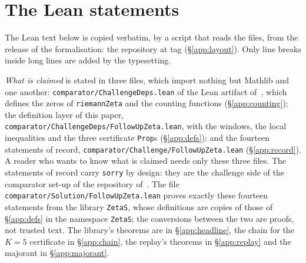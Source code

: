 \section{The Lean statements}\label{app:lean}
\sloppy

The Lean text below is copied verbatim, by a script that reads the files, from the release of the formalisation: the repository
\repourl{} at tag \repotag{} (\S\ref{app:layout}). Only line breaks inside long lines are added by the typesetting.

\emph{What is claimed} is stated in three files, which import nothing but Mathlib and one another: \texttt{comparator/ChallengeDeps.lean} of the Lean artifact
of~\cite{AF}, which defines the zeros of \texttt{riemannZeta} and the counting functions (\S\ref{app:counting}); the definition layer of this
paper, \texttt{comparator/ChallengeDeps/FollowUpZeta.lean}, with the windows, the local inequalities and the three certificate
\texttt{Prop}s (\S\ref{app:defs}); and the fourteen statements of record, \texttt{comparator/Challenge/FollowUpZeta.lean}
(\S\ref{app:record}). A reader who wants to know what is claimed needs only these three files. The statements of record carry
\texttt{sorry} by design: they are the challenge side of the comparator set-up of the repository of~\cite{AF}. The file
\texttt{comparator/Solution/FollowUpZeta.lean} proves exactly these fourteen statements from the library \texttt{ZetaS}, whose definitions
are copies of those of \S\ref{app:defs} in the namespace \texttt{ZetaS}; the conversions between the two are proofs, not trusted text. The
library's theorems are in \S\ref{app:headline}, the chain for the $K=5$ certificate in \S\ref{app:chain}, the replay's theorems in
\S\ref{app:replay} and the majorant in \S\ref{app:majorant}.

